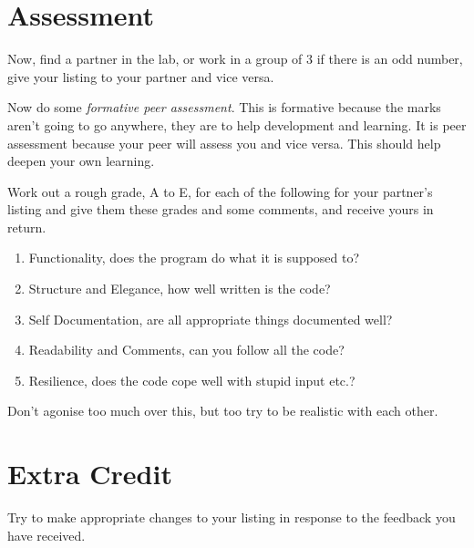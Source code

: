 \documentclass[12pt,oneside]{cttutorial}
\begin{document}
\section{Assessment}

Now, find a partner in the lab, or work in a group of 3 if there is an odd number, give your listing to your partner and vice versa.

Now do some \emph{formative peer assessment}. This is formative because the marks aren't going to go anywhere, they are to help development and learning. It is peer assessment because your peer will assess you and vice versa. This should help deepen your own learning.

Work out a rough grade, A to E, for each of the following for your partner's listing and give them these grades and some comments, and receive yours in return.

\begin{enumerate}
\item Functionality, does the program do what it is supposed to?
\item Structure and Elegance, how well written is the code?
\item Self Documentation, are all appropriate things documented well?
\item Readability and Comments, can you follow all the code?
\item Resilience, does the code cope well with stupid input etc.?
\end{enumerate}

Don't agonise too much over this, but too try to be realistic with each other.

\section{Extra Credit}

Try to make appropriate changes to your listing in response to the feedback you have received.
\end{document}
